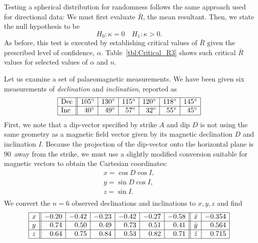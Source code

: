 Testing a spherical distribution for randomness follows the same approach used for directional data:  
We must first evaluate $\bar{R}$, the mean resultant.  Then, we state the null hypothesis to be
\begin{equation}
H_0:\kappa = 0 \quad H_1:\kappa >0.
\end{equation}	 
As before, this test is executed by establishing critical values of $\bar{R}$ given the prescribed level of 
confidence, $\alpha$.  Table~\ref{tbl:Critical_R3} shows such critical $\bar{R}$ values for selected values of $\alpha$ and $n$.
\begin{example}
Let us examine a set of palaeomagnetic measurements.  We 
have been given six measurements of \emph{declination} and \emph{inclination}, reported as
$$
\begin{array}{|l||r|r|r|r|r|r|}
\hline
\mbox{Dec} & 105^{\circ} & 130^{\circ} & 115^{\circ}
& 120^{\circ} & 118^{\circ} & 145^{\circ} \\ \hline
\mbox{Inc} & 40^{\circ} & 49^{\circ} & 57^{\circ} & 32^{\circ} & 55^{\circ} & 45^{\circ}\\ \hline
\end{array}
$$
First, we note that a dip-vector specified by strike $A$ and dip $D$ is not using the same geometry as
a magnetic field vector given by its magnetic declination $D$ and inclination $I$.
Because the projection of the dip-vector onto the horizontal plane is 90\DS\ away from the strike,
we must use a slightly modified conversion suitable for magnetic vectors to obtain the Cartesian coordinates:
\begin{equation} \begin{array}{lll}
x = \cos D \cos I,\\
y = \sin D \cos I,\\
z = \sin I.\\
\end{array}
\end{equation}
We convert the $n = 6$ observed declinations and inclinations to $x,y,z$ and find
$$
\begin{array}{|l||r|r|r|r|r|r||l|r|}
\hline
x & -0.20 & -0.42 & -0.23 & -0.42 & -0.27 & -0.58 & \bar{x} & -0.354 \\ \hline
y &  0.74 &  0.50 &  0.49 &  0.73 &  0.51 &  0.41 & \bar{y} &  0.564 \\ \hline
z &  0.64 &  0.75 &  0.84 &  0.53 &  0.82 &  0.71 & \bar{z} &  0.715 \\ \hline
\end{array}
$$
\end{example}
